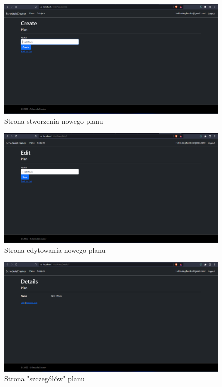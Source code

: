 \documentclass[a4paper,12pt,oneside]{book} %
\begin{document}
\begin{figure}[h]
    \centering\includegraphics[width=14cm]{12.png}
    \caption{Strona stworzenia nowego planu}
\end{figure}

\begin{figure}[h]
    \centering\includegraphics[width=14cm]{13.png}
    \caption{Strona edytowania nowego planu}
\end{figure}

\begin{figure}[h]
    \centering\includegraphics[width=14cm]{14.png}
    \caption{Strona "szczegółów" planu}
\end{figure}
\end{document}
